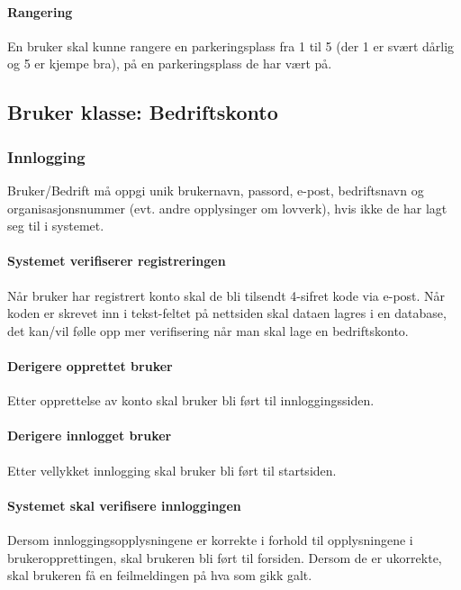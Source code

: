 \documentclass[12pt]{article}
\begin{document}
            \paragraph{Rangering}
            En bruker skal kunne rangere en parkeringsplass fra 1 til 5 (der 1 er svært dårlig og 5 er kjempe bra), på en parkeringsplass de har vært på.

    \subsection{Bruker klasse: Bedriftskonto}

        \subsubsection{Innlogging}
            Bruker/Bedrift må oppgi unik brukernavn, passord, e-post, bedriftsnavn og organisasjonsnummer (evt. andre opplysinger om lovverk), hvis ikke de har lagt seg til i systemet.

            \paragraph{Systemet verifiserer registreringen}
            Når bruker har registrert konto skal de bli tilsendt 4-sifret kode via e-post. Når koden er skrevet inn i tekst-feltet på nettsiden skal dataen lagres i en database, det kan/vil følle opp mer verifisering når man skal lage en bedriftskonto.

            \paragraph{Derigere opprettet bruker}
            Etter opprettelse av konto skal bruker bli ført til innloggingssiden.

            \paragraph{Derigere innlogget bruker}
            Etter vellykket innlogging skal bruker bli ført til startsiden.

            \paragraph{Systemet skal verifisere innloggingen}
            Dersom innloggingsopplysningene er korrekte i forhold til opplysningene i brukeropprettingen, skal brukeren bli ført til forsiden. Dersom de er ukorrekte, skal brukeren få en feilmeldingen på hva som gikk galt.
\end{document}
